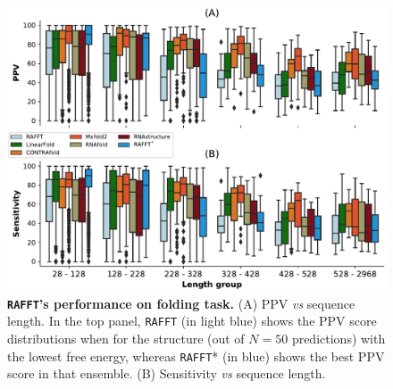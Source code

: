 \begin{figure}[t!]
	\centering
	\includegraphics[width=1.\linewidth]{../res/images/rafft/accuracy.pdf}
	\caption{\label{perf_fig} \textbf{\texttt{RAFFT}'s performance on folding task.} (A) PPV \emph{vs} sequence length. In the top panel, \texttt{RAFFT} (in light blue) shows the PPV score distributions when for the structure (out of $N=50$ predictions) with the lowest free energy, whereas \texttt{RAFFT}* (in blue) shows the best PPV score in that ensemble. (B) Sensitivity \emph{vs} sequence length.}
\end{figure}

